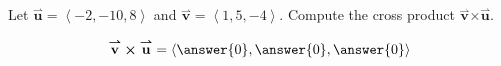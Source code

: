 \documentclass{ximera}
\author{Gregory Hartman \and Matthew Carr}
\begin{document}
\begin{exercise}
Let $\overset{\boldsymbol{\rightharpoonup}}{\mathbf{u}} = \left< -2,-10,8 \right>$ and $\overset{\boldsymbol{\rightharpoonup}}{\mathbf{v}} = \left< 1,5,-4 \right>$. Compute the cross product $\overset{\boldsymbol{\rightharpoonup}}{\mathbf{v}} \boldsymbol\times \overset{\boldsymbol{\rightharpoonup}}{\mathbf{u}}$.

\begin{prompt}
\[
\overset{\boldsymbol{\rightharpoonup}}{\mathbf{v}} \boldsymbol\times \overset{\boldsymbol{\rightharpoonup}}{\mathbf{u}} = \left< \answer{0},\answer{0},\answer{0} \right>
\]
\end{prompt}


\end{exercise}
\end{document}
